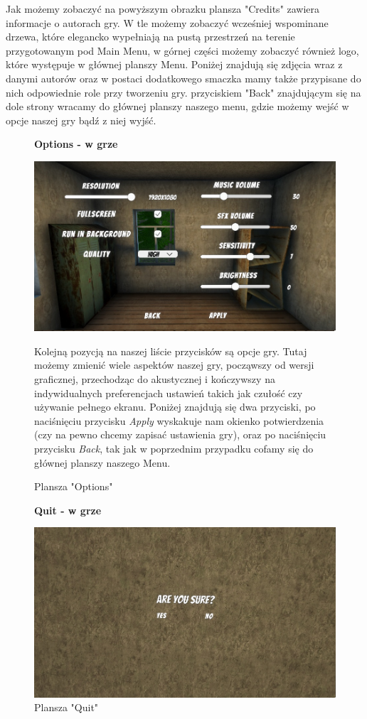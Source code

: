 Jak możemy zobaczyć na powyższym obrazku plansza "Credits" zawiera informacje o autorach gry. W tle możemy zobaczyć wcześniej wspominane drzewa, które elegancko wypełniają na pustą przestrzeń na terenie przygotowanym pod Main Menu, w górnej części możemy zobaczyć również logo, które występuje w głównej planszy Menu. Poniżej znajdują się zdjęcia wraz z danymi autorów oraz w postaci dodatkowego smaczka mamy także przypisane do nich odpowiednie role przy tworzeniu gry. przyciskiem "Back" znajdującym się na dole strony wracamy do głównej planszy naszego menu, gdzie możemy wejść w opcje naszej gry bądź z niej wyjść.\\

\begin{figure}[h]
    \begin{center}
    {\bfseries Options - w grze}
    \end{center}
    \centering
    \includegraphics[width=0.75\linewidth]{Images/OptionsInGame.jpg}
    \caption{Plansza "Options"}
    \begin{flushleft}
    Kolejną pozycją na naszej liście przycisków są opcje gry. Tutaj możemy zmienić wiele aspektów naszej gry, począwszy od wersji graficznej, przechodząc do akustycznej i kończywszy na indywidualnych preferencjach ustawień takich jak czułość czy używanie pełnego ekranu. Poniżej znajdują się dwa przyciski, po naciśnięciu przycisku \textit{Apply} wyskakuje nam okienko potwierdzenia (czy na pewno chcemy zapisać ustawienia gry), oraz po naciśnięciu przycisku \textit{Back}, tak jak w poprzednim przypadku cofamy się do głównej planszy naszego Menu.\\
    \end{flushleft}
\end{figure}
\FloatBarrier
\begin{figure}[h]
\begin{center}
{\bfseries Quit - w grze}
\end{center}
    \centering
    \includegraphics[width=0.75\linewidth]{Images/QuitInGame.jpg}
    \caption{Plansza "Quit"}
\end{figure}
\FloatBarrier


